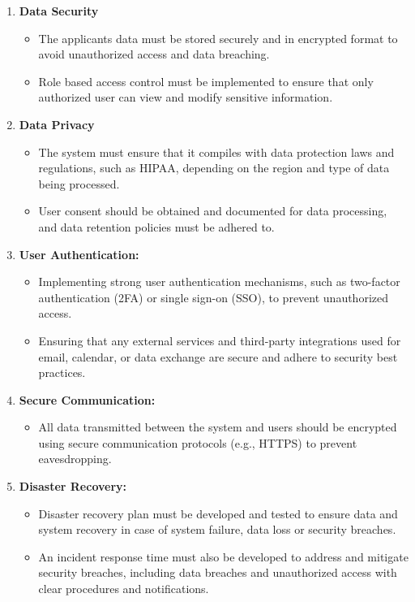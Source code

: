 \begin{enumerate}
    \item \textbf{Data Security}
		\begin{itemize}
			\item The applicants data must be stored securely and in encrypted format to avoid unauthorized access and data breaching.
			\item Role based access control must be implemented to ensure that only authorized user can view and modify sensitive information.
		\end{itemize}
    \item \textbf{Data Privacy}
		\begin{itemize}
			\item The system must ensure that it compiles with data protection laws and regulations, such as HIPAA, depending on the region and type of data being processed.
			\item User consent should be obtained and documented for data processing, and data retention policies must be adhered to.
		\end{itemize}
    \item \textbf{User Authentication:}
		\begin{itemize}
			\item Implementing strong user authentication mechanisms, such as two-factor authentication (2FA) or single sign-on (SSO), to prevent unauthorized access.
			\item Ensuring that any external services and third-party integrations used for email, calendar, or data exchange are secure and adhere to security best practices.
		\end{itemize}
    \item \textbf{Secure Communication:}
		\begin{itemize}
			\item All data transmitted between the system and users should be encrypted using secure communication protocols (e.g., HTTPS) to prevent eavesdropping.
		\end{itemize}
    \item \textbf{Disaster Recovery:}
		\begin{itemize}
			\item Disaster recovery plan must be developed and tested to ensure data and system recovery in case of system failure, data loss or security breaches.
			\item An incident response time must also be developed to address and mitigate security breaches, including data breaches and unauthorized access with clear procedures and notifications.

\end{itemize}
\end{enumerate}
